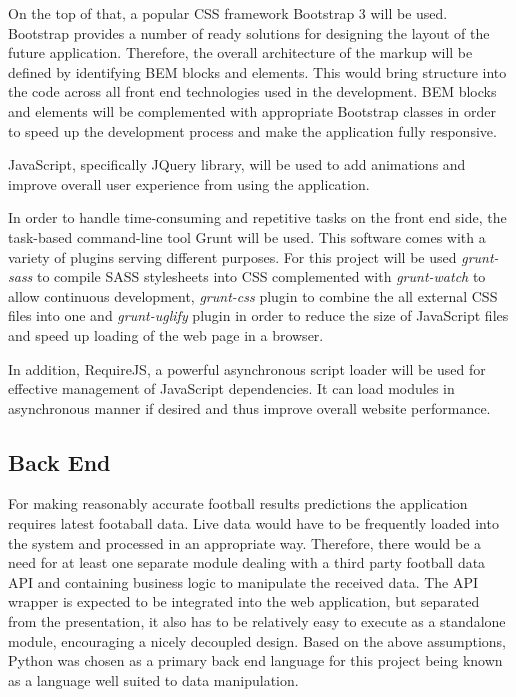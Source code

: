 	On the top of that, a popular CSS framework Bootstrap 3 \cite{bootstrap} will be used. Bootstrap provides a number of ready solutions for designing the layout of the future application. Therefore, the overall architecture of the markup will be defined by identifying BEM blocks and elements. This would bring structure into the code across all front end technologies used in the development. BEM blocks and elements will be complemented with appropriate Bootstrap classes in order to speed up the development process and make the application fully responsive.
 
	JavaScript, specifically JQuery library\cite{jquery}, will be used to add animations and improve overall user experience from using the application.  

	In order to handle time-consuming and repetitive tasks on the front end side, the task-based command-line tool Grunt will be used. This software comes with a variety of plugins serving different purposes. For this project will be used \emph{grunt-sass} to compile SASS stylesheets into CSS complemented with \emph{grunt-watch} to allow continuous development, \emph{grunt-css} plugin to combine the all external CSS files into one and \emph{grunt-uglify} plugin in order to reduce the size of JavaScript files and speed up loading of the web page in a browser. 
	
	In addition, RequireJS\cite{requirejs}, a powerful asynchronous script loader will be used for effective management of JavaScript dependencies. It can load modules in asynchronous manner if desired and thus improve overall website performance.

\subsection{Back End}
	For making reasonably accurate football results predictions the application requires latest footaball data. Live data would have to be frequently loaded into the system and processed in an appropriate way. Therefore, there would be a need for at least one separate module dealing with a third party football data API and containing business logic to manipulate the received data. The API wrapper is expected to be integrated into the web application, but separated from the presentation, it also has to be relatively easy to execute as a standalone module, encouraging a nicely decoupled design. Based on the above assumptions, Python was chosen as a primary back end language for this project being known as a language well suited to data manipulation.\par

